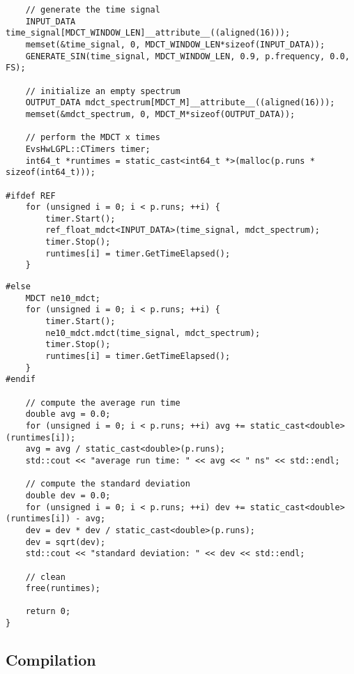 \documentclass{article}
\begin{document}
\begin{lstlisting}
    // generate the time signal
    INPUT_DATA time_signal[MDCT_WINDOW_LEN]__attribute__((aligned(16)));
    memset(&time_signal, 0, MDCT_WINDOW_LEN*sizeof(INPUT_DATA));
    GENERATE_SIN(time_signal, MDCT_WINDOW_LEN, 0.9, p.frequency, 0.0, FS);

    // initialize an empty spectrum
    OUTPUT_DATA mdct_spectrum[MDCT_M]__attribute__((aligned(16)));
    memset(&mdct_spectrum, 0, MDCT_M*sizeof(OUTPUT_DATA));

    // perform the MDCT x times
    EvsHwLGPL::CTimers timer;
    int64_t *runtimes = static_cast<int64_t *>(malloc(p.runs * sizeof(int64_t)));

#ifdef REF
    for (unsigned i = 0; i < p.runs; ++i) {
        timer.Start();
        ref_float_mdct<INPUT_DATA>(time_signal, mdct_spectrum);
        timer.Stop();
        runtimes[i] = timer.GetTimeElapsed();
    }
\end{lstlisting}
\newpage
\begin{lstlisting}
#else
    MDCT ne10_mdct;
    for (unsigned i = 0; i < p.runs; ++i) {
        timer.Start();
        ne10_mdct.mdct(time_signal, mdct_spectrum);
        timer.Stop();
        runtimes[i] = timer.GetTimeElapsed();
    }
#endif

    // compute the average run time
    double avg = 0.0;
    for (unsigned i = 0; i < p.runs; ++i) avg += static_cast<double>(runtimes[i]);
    avg = avg / static_cast<double>(p.runs);
    std::cout << "average run time: " << avg << " ns" << std::endl;

    // compute the standard deviation
    double dev = 0.0;
    for (unsigned i = 0; i < p.runs; ++i) dev += static_cast<double>(runtimes[i]) - avg;
    dev = dev * dev / static_cast<double>(p.runs);
    dev = sqrt(dev);
    std::cout << "standard deviation: " << dev << std::endl;

    // clean
    free(runtimes);

    return 0;
}
\end{lstlisting}

\subsection{Compilation}\label{app:perf_mdct_ne10_cmake}
\end{document}
